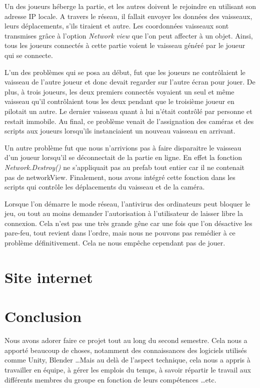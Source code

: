 \documentclass[12pt, titlepage]{article}
\begin{document}
\begin{spacing}{1.5}
Un des joueurs héberge la partie, et les autres doivent le rejoindre en utilisant son adresse IP locale. A travers le réseau, il fallait envoyer les données des vaisseaux, leurs déplacements, s'ils tiraient et autre. Les coordonnées vaisseaux sont transmises grâce à l'option \textit{Network view} que l'on peut affecter à un objet. Ainsi, tous les joueurs connectés à cette partie voient le vaisseau généré par le joueur qui se connecte.

L'un des problèmes qui se posa au début, fut que les joueurs ne contrôlaient le vaisseau de l'autre joueur et donc devait regarder sur l'autre écran pour jouer. De plus, à trois joueurs, les deux
premiers connectés voyaient un seul et même vaisseau qu'il contrôlaient tous les deux pendant que le troisième joueur en pilotait un autre. Le dernier vaisseau quant à lui n'était contrôlé par personne et restait immobile. Au final, ce problème venait de l'assignation des caméras et des scripts aux joueurs lorsqu'ils instanciaient un nouveau vaisseau en arrivant.

Un autre problème fut que nous n'arrivions pas à faire disparaitre le vaisseau d'un joueur lorsqu'il se déconnectait de la partie en ligne. En effet la fonction \textit{Network.Destroy()} ne s'appliquait pas au prefab tout entier car il ne contenait pas de networkView. Finalement, nous avons intégré cette fonction dans les scripts qui contrôle les déplacements du vaisseau et de la caméra.

Lorsque l'on démarre le mode réseau, l'antivirus des ordinateurs peut bloquer le jeu, ou tout au moins demander l'autorisation à l'utilisateur de laisser libre la connexion. Cela n'est pas une très grande gêne car une fois que l'on désactive les pare-feu, tout revient dans l'ordre, mais nous ne pouvons pas remédier à ce problème définitivement. Cela ne nous empêche cependant pas de jouer.

\newpage
\section{Site internet}

\newpage
\section*{Conclusion}

Nous avons adorer faire ce projet tout au long du second semestre. Cela nous a apporté beaucoup de choses, notamment des connaissances des logiciels utilisés comme Unity, Blender \dots Mais au delà de l'aspect technique, cela nous a appris à travailler en équipe, à gérer les emplois du temps, à savoir répartir le travail aux différents membres du groupe en fonction de leurs compétences \dots etc.

\end{spacing}
\end{document}
